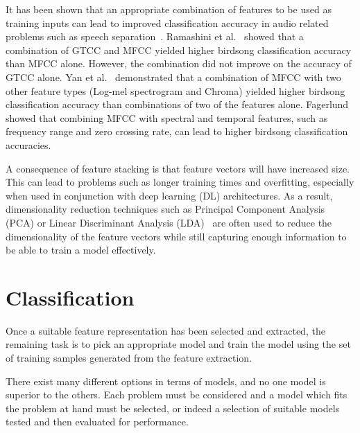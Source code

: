 It has been shown that an appropriate combination of features to be used as
training inputs can lead to improved classification accuracy in audio related
problems such as speech separation~\cite{wang2012exploring}. Ramashini et
al.~\cite{ramashini2022robust} showed that a combination of GTCC and MFCC yielded
higher birdsong classification accuracy than MFCC alone. However, the
combination did not improve on the accuracy of GTCC alone. Yan et
al.~\cite{yan2021birdsong} demonstrated that a combination of MFCC with two other
feature types (Log-mel spectrogram and Chroma) yielded higher birdsong
classification accuracy than combinations of two of the features alone.
Fagerlund~\cite{fagerlund2007bird} showed that combining MFCC with spectral and
temporal features, such as frequency range and zero crossing rate, can lead to
higher birdsong classification accuracies.

A consequence of feature stacking is that feature vectors will have increased
size. This can lead to problems such as longer training times and overfitting,
especially when used in conjunction with deep learning (DL) architectures. As a
result, dimensionality reduction techniques such as Principal Component
Analysis (PCA) or Linear Discriminant Analysis (LDA)~\cite{ramashini2019bird}
are often used to reduce the dimensionality of the feature vectors while still
capturing enough information to be able to train a model effectively.

\section{Classification}\label{sec:classification}

Once a suitable feature representation has been selected and extracted, the
remaining task is to pick an appropriate model and train the model using the set
of training samples generated from the feature extraction.

There exist many different options in terms of models, and no one model is
superior to the others. Each problem must be considered and a model which fits
the problem at hand must be selected, or indeed a selection of suitable models
tested and then evaluated for performance.

